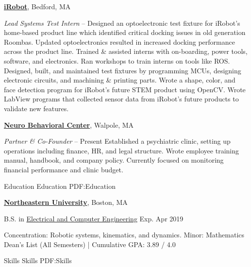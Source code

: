 \documentclass[letterpaper,MMMyyyy,nonstopmode]{simpleresumecv}
\begin{document}
\begin{Body}

\Entry
\href{http://www.irobot.com}
{\textbf{iRobot}},
Bedford, MA

\Gap
\textit{Lead Systems Test Intern}
\hfill
{} -- 
\BulletItem
Designed an optoelectronic test fixture for iRobot's home-based product line which identified critical docking issues in old generation Roombas. Updated optoelectronics resulted in increased docking performance across the product line.
\BulletItem
Trained \& assisted interns with on-boarding, power tools, software, and electronics. Ran workshops to train interns on tools like ROS.
\BulletItem
Designed, built, and maintained test fixtures by programming MCUs, designing electronic circuits, and machining \& printing parts.
\BulletItem
Wrote a shape, color, and face detection program for iRobot's future STEM product using OpenCV.
\BulletItem
Wrote LabView programs that collected sensor data from iRobot's future products to validate new features.
\SectionSpace


\Entry
\href{https://www.nbchealthcare.com/}
{\textbf{Neuro Behavioral Center}},
Walpole, MA

\Gap
\textit{Partner \& Co-Founder}
\hfill
{} -- Present
\BulletItem
Established a psychiatric clinic, setting up operations including finance, HR, and legal structure.
\BulletItem
Wrote employee training manual, handbook, and company policy.
\BulletItem
Currently focused on monitoring financial performance and clinic budget.


\Section
{Education}
{Education}
{PDF:Education}


\Entry
\href{http://www.northeastern.edu}
{\textbf{Northeastern University}},
Boston, MA

\Gap
B.S. in 
\href{http://www.ece.neu.edu/}
{Electrical and Computer Engineering}
\hfill
Exp. Apr 2019
\begin{Detail}
	\SubBulletItem
	Concentration: Robotic systems, kinematics, and dynamics.
	\SubBulletItem
	Minor: Mathematics
	\SubBulletItem
	Dean's List (All Semesters) | Cumulative GPA: 3.89 / 4.0
\end{Detail}


\Section
{Skills}
{Skills}
{PDF:Skills}


\end{Body}
\end{document}
